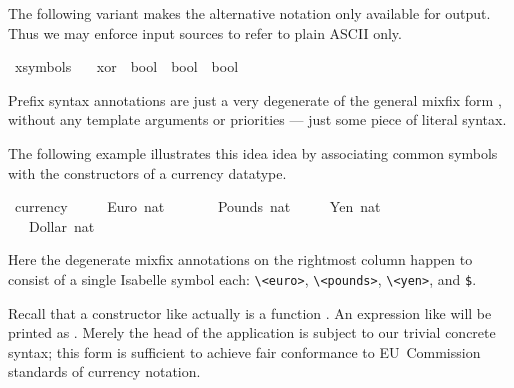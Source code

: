 \begin{isabellebody}
\begin{isamarkuptext}
  \medskip The following variant makes the alternative \isa{{\isasymoplus}}
  notation only available for output.  Thus we may enforce input
  sources to refer to plain ASCII only.%
\end{isamarkuptext}%
\isamarkuptrue%
\ {\isacharparenleft}xsymbols\ \isanewline
\ \ xor\ {\isacharcolon}{\isacharcolon}\ {\isachardoublequote}bool\ {\isasymRightarrow}\ bool\ {\isasymRightarrow}\ bool{\isachardoublequote}\ \ \ \ {\isacharparenleft}\ {\isachardoublequote}{\isasymoplus}{\isasymignore}{\isachardoublequote}\ {}{}{\isacharparenright}\isamarkupfalse%
%
\isamarkuptrue%
%
\begin{isamarkuptext}%
Prefix syntax annotations are just a
  very degenerate of the general mixfix form \cite{isabelle-ref},
  without any template arguments or priorities --- just some piece of
  literal syntax.

  The following example illustrates this idea idea by associating
  common symbols with the constructors of a currency datatype.%
\end{isamarkuptext}%
\isamarkuptrue%
\ currency\ {\isacharequal}\isanewline
\ \ \ \ Euro\ nat\ \ \ \ {\isacharparenleft}{\isachardoublequote}{\isasymeuro}{\isachardoublequote}{\isacharparenright}\isanewline
\ \ {\isacharbar}\ Pounds\ nat\ \ {\isacharparenleft}{\isachardoublequote}{\isasympounds}{\isachardoublequote}{\isacharparenright}\isanewline
\ \ {\isacharbar}\ Yen\ nat\ \ \ \ \ {\isacharparenleft}{\isachardoublequote}{\isasymyen}{\isachardoublequote}{\isacharparenright}\isanewline
\ \ {\isacharbar}\ Dollar\ nat\ \ {\isacharparenleft}{\isachardoublequote}{\isachardollar}{\isachardoublequote}{\isacharparenright}\isamarkupfalse%
%
\begin{isamarkuptext}%
Here the degenerate mixfix annotations on the rightmost column
  happen to consist of a single Isabelle symbol each:
  \verb,\,\verb,<euro>,, \verb,\,\verb,<pounds>,,
  \verb,\,\verb,<yen>,, and \verb,$,.

  Recall that a constructor like  actually is a function
  .  An expression like  will
  be printed as .  Merely the head of the application is
  subject to our trivial concrete syntax; this form is sufficient to
  achieve fair conformance to EU~Commission standards of currency
  notation.


\end{isamarkuptext}
\end{isabellebody}
